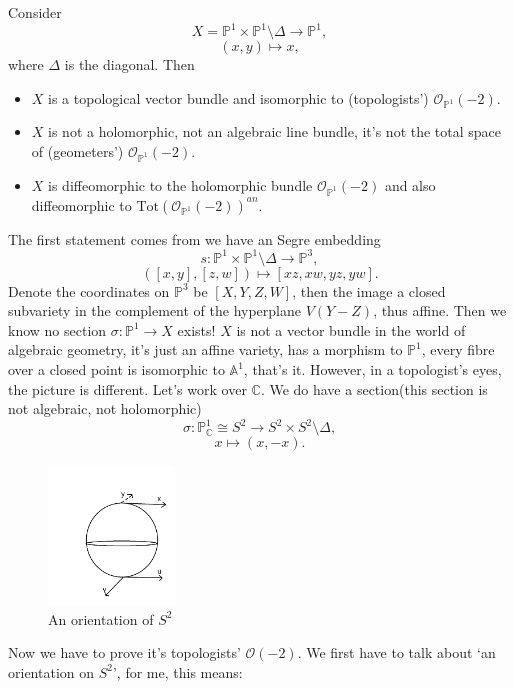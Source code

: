 \documentclass[main.tex]{subfiles}
\begin{document}
\begin{example}
Consider $$X=\mathbb{P}^{1}\times \mathbb{P}^{1}\setminus\Delta\rightarrow \mathbb{P}^{1},$$
$$(x,y)\mapsto x,$$
where $\Delta$ is the diagonal. Then
\begin{itemize}
\item $X$ is a topological vector bundle and isomorphic to (topologists') $\mathcal{O}_{\mathbb{P}^{1}}(-2).$
\item $X$ is not a holomorphic, not an algebraic line bundle, it's not the total space of (geometers') $\mathcal{O}_{\mathbb{P}^{1}}(-2).$
\item $X$ is diffeomorphic to the holomorphic bundle $\mathcal{O}_{\mathbb{P}^{1}}(-2)$ and also diffeomorphic to $\mathrm{Tot}(\mathcal{O}_{\mathbb{P}^{1}}(-2))^{an}.$
\end{itemize}
The first statement comes from we have an Segre embedding 
$$s:\mathbb{P}^{1}\times \mathbb{P}^{1}\setminus \Delta\rightarrow \mathbb{P}^{3},$$
$$([x,y],[z,w])\mapsto [xz,xw, yz, yw].$$
Denote the coordinates on $\mathbb{P}^{3}$ be $[X,Y,Z,W]$, then the image a closed subvariety in the complement of the hyperplane $V(Y-Z)$, thus affine. Then we know no section $\sigma: \mathbb{P}^{1}\rightarrow X$ exists! $X$ is not a vector bundle in the world of algebraic geometry, it's just an affine variety, has a morphism to $\mathbb{P}^{1}$, every fibre over a closed point is isomorphic to $\mathbb{A}^{1}$, that's it. However, in a topologist's eyes, the picture is different. Let's work over $\mathbb{C}$. We do have a section(this section is not algebraic, not holomorphic)
$$\sigma:\mathbb{P}_{\mathbb{C}}^{1}\cong S^{2}\rightarrow S^{2}\times S^{2}\setminus \Delta,$$
$$x\mapsto (x,-x).$$
\begin{figure}[h!]
\centering
\includegraphics[width=0.3\textwidth]{img/sphere.png}
\caption{An orientation of $S^{2}$}
\label{fig:An orientation of $S^{2}$}
\end{figure}
\end{example}
Now we have to prove it's topologists' $\mathcal{O}(-2)$.  We first have to talk about `an orientation on $S^{2}$', for me, this means: 
\end{document}
